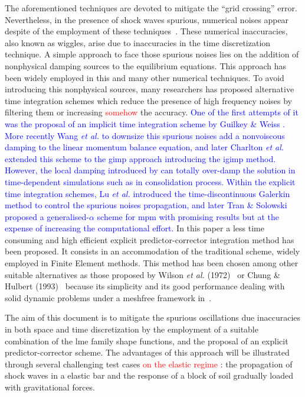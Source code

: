 \documentclass[preprint,12pt,a4paper]{elsarticle}
\newcommand{\PNA}[1]{
  \textcolor{red}{{#1}}
}
\newcommand{\MMP}[1]{
  \textcolor{blue}{{#1}}
}
\begin{document}
The aforementioned techniques are devoted to mitigate the
``grid crossing'' error. Nevertheless, in the presence of shock waves spurious,
numerical noises appear despite of the employment of these
techniques~\cite{Tran2019e}. These numerical inaccuracies, also known
as wiggles, arise due to inaccuracies in the time discretization technique.
A simple approach to face those spurious noises lies on the addition of nonphysical damping sources to the equilibrium equations. This
approach has been widely employed in this and many other numerical
techniques. To avoid introducing this nonphysical sources, many
researchers has proposed alternative time integration
schemes which reduce the presence of high frequency noises by
filtering them or increasing \PNA{somehow} the accuracy. \MMP{One of the first attempts of it was
the proposal of an implicit time integration scheme by Guilkey \&
Weiss \cite{Guilkey_2003}. More recently Wang {\it et al.}
\cite{Wang_2016} to downsize this spurious noises add a nonvoiscous
damping to the linear momentum balance equation, and later Charlton
{\it et al.} \cite{Charlton_2017} extended this scheme to the
\acrshort{gimp} approach introducing the \acrfull{igimp}
method. However, the local damping introduced by 
\cite{Wang_2016} can totally over-damp the solution in time-dependent
simulations such as in consolidation process. Within the explicit
time integration schemes, Lu {\it et al.}\cite{LU_2018} introduced the time-discontinuous Galerkin method to control the spurious noises
propagation, and later Tran \& Solowski~\cite{Tran2019e}
proposed a generalised-$\alpha$ scheme for \acrshort{mpm} with
promising results but at the expense of increasing the computational
effort.} In this paper a less time consuming and high efficient explicit predictor-corrector integration method has been
proposed. It consists in an accommodation of the traditional  scheme, widely employed in Finite Element methods. This method
has been chosen among other suitable alternatives as those proposed
by Wilson {\it et al.} (1972)~\cite{Wilson1972} or Chung \& Hulbert
(1993)~\cite{Geranlized_alpha_1993} because its simplicity and its good
performance dealing with solid dynamic problems under a meshfree
framework in~\cite{Navas2018a}.

The aim of this document is to mitigate the spurious oscillations due
inaccuracies in both space and time discretization by the employment of a
suitable combination of the \acrshort{lme} family shape functions, and the proposal of an explicit predictor-corrector scheme. The advantages of
this approach will be illustrated through several challenging test cases \PNA{on the elastic regime}: the
propagation of shock waves in a elastic bar and the response of a block of soil gradually loaded with gravitational forces.
\end{document}
